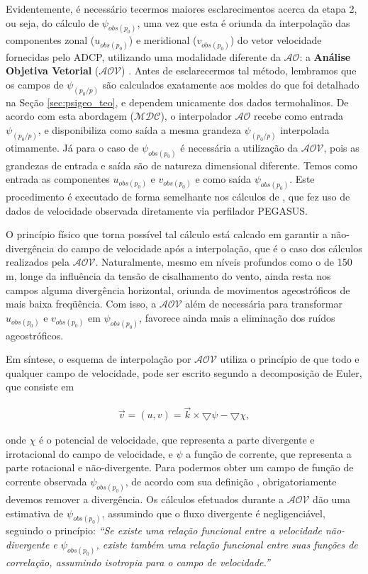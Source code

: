 \hspace{6mm} Evidentemente, é necessário tecermos maiores esclarecimentos acerca da etapa 2, ou seja, do cálculo 
de $\psi_{obs(p_0)}$, uma vez que 
esta é oriunda da interpolação das componentes zonal ($u_{obs(p_0)}$) e meridional ($v_{obs(p_0)}$) do vetor velocidade fornecidas pelo 
ADCP, utilizando uma 
modalidade diferente da $\mathcal{AO}$: a {\bf Análise Objetiva Vetorial} ($\mathcal{AOV}$) \citep{bretherton_etal1976}.
Antes de esclarecermos
tal método, lembramos que os campos de $\psi_{(p_0/p)}$ são calculados exatamente aos moldes do que foi detalhado na Seção  
\ref{sec:psigeo_teo}, e dependem unicamente dos dados termohalinos. De acordo com esta abordagem ($\mathcal{MDC}$), o interpolador 
$\mathcal{AO}$
recebe como entrada $\psi_{(p_0/p)}$, e disponibiliza
como saída a mesma grandeza $\psi_{(p_0/p)}$ interpolada otimamente. Já para o caso de $\psi_{obs(p_0)}$ é necessária
a utilização da $\mathcal{AOV}$, pois as grandezas de entrada e saída são de natureza dimensional diferente. Temos
como entrada as componentes $u_{obs(p_0)}$ e $v_{obs(p_0)}$ e como saída $\psi_{obs(p_0)}$. Este procedimento é executado
de forma semelhante nos cálculos de \cite{silveira_etal2000B}, que fez uso de dados de velocidade observada diretamente via
perfilador PEGASUS. 

O princípio físico que torna possível tal cálculo está calcado em garantir a não-divergência do campo de velocidade 
após a interpolação, que é o caso dos cálculos realizados pela $\mathcal{AOV}$.
Naturalmente, mesmo em níveis profundos como o de 150 m,
longe da influência da tensão de cisalhamento do vento, ainda resta nos campos alguma divergência horizontal, 
oriunda de movimentos ageostróficos de mais baixa freq\"uência. Com isso, a $\mathcal{AOV}$ além de necessária
para transformar $u_{obs(p_0)}$ e $v_{obs(p_0)}$ em $\psi_{obs(p_0)}$, favorece ainda mais a eliminação
dos ruídos ageostróficos. 

Em síntese, o esquema de interpolação por $\mathcal{AOV}$ utiliza o princípio de que todo e qualquer campo
de velocidade, pode ser escrito segundo a decomposição de Euler, que consiste em 

\begin{eqnarray}
\vec{v} = (u,v) = \vec{k} \times \bigtriangledown \psi - \bigtriangledown \chi,
\label{eq:cauchyriemman}
\end{eqnarray}

onde $\chi$ é o potencial de velocidade, que representa a parte divergente e irrotacional do campo de velocidade,
e $\psi$ a função de corrente, que representa a parte  
rotacional e não-divergente. Para podermos obter um campo de função de corrente observada $\psi_{obs(p_0)}$, de acordo com sua definição \citep{kundu1990}, obrigatoriamente devemos
remover a divergência.  Os cálculos efetuados durante a $\mathcal{AOV}$ dão uma estimativa de $\psi_{obs(p_0)}$, assumindo que
o fluxo divergente é negligenciável, seguindo o princípio:
{\it ``Se existe uma relação funcional entre a velocidade não-divergente e $\psi_{obs(p_0)}$, existe também uma relação funcional 
entre suas funções de correlação, assumindo isotropia para o campo de velocidade.''} 

